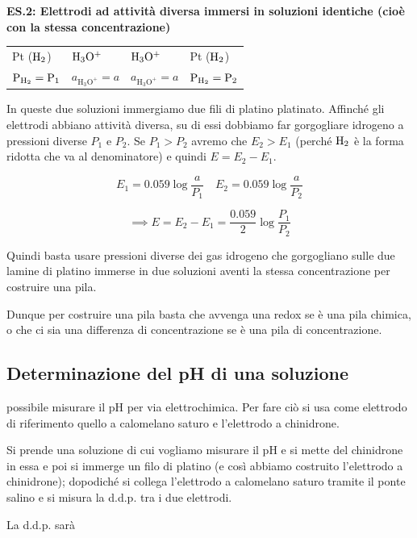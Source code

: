 \vspace{0.2cm}\textbf{ES.2: Elettrodi ad attività diversa immersi in soluzioni identiche (cioè con la stessa concentrazione)}

\begin{center}
    \begin{tabular}{p{1.8cm}|p{2cm}||p{2cm}|p{2cm}}
        Pt ($\rm H_2$) & $\rm H_3O^+$ & $\rm H_3O^+$ & Pt ($\rm H_2$)\\[0.5ex]
        $\rm P_{H_2} = P_1$ & $a_{\text{H}_3\text{O}^+}=a$ & $a_{\text{H}_3\text{O}^+}=a$ & $\rm P_{H_2} = P_2$\\[0.5ex]
    \end{tabular}
\end{center}

In queste due soluzioni immergiamo due fili di platino platinato. Affinché gli elettrodi abbiano attività diversa, su di essi dobbiamo far gorgogliare idrogeno a pressioni diverse $P_1$ e $P_2$. Se $P_1>P_2$ avremo che $E_2>E_1$ (perché $\rm H_2$ è la forma ridotta che va al denominatore) e quindi $E= E_2 - E_1$. 

$$E_1 = 0.059 \log \frac{a}{P_1} \quad E_2 = 0.059 \log \frac{a}{P_2}$$

$$\implies E = E_2 - E_1 = \frac{0.059}{2} \log \frac{P_1}{P_2}$$

Quindi basta usare pressioni diverse dei gas idrogeno che gorgogliano sulle due lamine di platino immerse in due soluzioni aventi la stessa concentrazione per costruire una pila.

\vspace{0.2cm}Dunque per costruire una pila basta che avvenga una redox se è una pila chimica, o che ci sia una differenza di concentrazione se è una pila di concentrazione.
\subsection{Determinazione del pH di una soluzione}

\E possibile misurare il pH per via elettrochimica. Per fare ciò si usa come elettrodo di riferimento quello a calomelano saturo e l'elettrodo a chinidrone.

Si prende una soluzione di cui vogliamo misurare il pH e si mette del chinidrone in essa e poi si immerge un filo di platino (e così abbiamo costruito l'elettrodo a chinidrone); dopodiché si collega l'elettrodo a calomelano saturo tramite il ponte salino e si misura la d.d.p. tra i due elettrodi. 

La d.d.p. sarà

